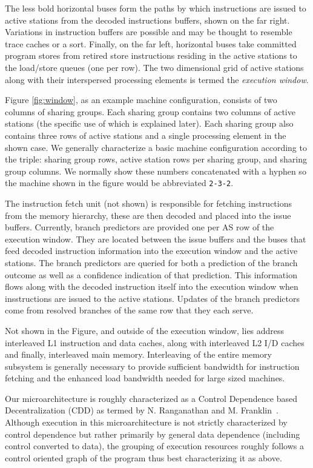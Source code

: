 \documentclass[10pt,dvips]{article}
\begin{document}
The less bold horizontal buses
form the paths by which instructions are issued to active stations
from the decoded instructions buffers, shown on the far right.
Variations in instruction buffers are possible and may be thought
to resemble trace caches or a sort.
Finally, on the far left, horizontal buses take committed program
stores from retired store instructions residing in the active stations
to the load/store queues (one per row).
The two dimensional
grid of active stations along with their interspersed processing elements
is termed the \textit{execution window}.

Figure \ref{fig:window}, as an example machine configuration, consists of 
two columns of sharing groups.  Each sharing group contains two columns of
active stations (the specific use of which is explained later).
Each sharing group also contains three rows of active stations
and a single processing element in the shown case.  
We generally characterize
a basic machine configuration according to the triple: sharing group
rows, active station
rows per sharing group, and sharing group columns.  We normally
show these numbers concatenated with a hyphen so the machine shown
in the figure would be abbreviated {\tt 2-3-2}.

The instruction fetch unit (not shown) is responsible for
fetching instructions from the memory hierarchy, these are then decoded
and placed into the issue buffers.   
Currently, branch predictors are provided one per AS row of the execution
window.  
They are located between the issue buffers and the buses that feed
decoded instruction information into the execution window and the
active stations.  The branch predictors are queried for both
a prediction of the branch outcome as well as a confidence
indication of that prediction.  This information flows along with
the decoded instruction itself into the
execution window when insstructions are issued to the active stations.
Updates of the branch predictors come from resolved branches
of the same row that they each serve.

Not shown in the Figure, and outside of the execution window,
lies address interleaved L1 instruction and data caches, along with
interleaved L2 I/D caches and finally, interleaved main memory.
Interleaving of the entire memory subsystem is generally necessary
to provide sufficient bandwidth for instruction fetching and the
enhanced load bandwidth needed for large sized machines.

Our microarchitecture is roughly characterized as a Control Dependence
based Decentralization (CDD) as termed by N. Ranganathan and
M. Franklin~\cite{Ranganathan98}.
Although execution in this microarchitecture is not strictly
characterized by control dependence but rather primarily by
general data dependence (including control converted to data),
the grouping of execution resources roughly follows a control
oriented graph of the program thus best characterizing it as above.
%
\end{document}
